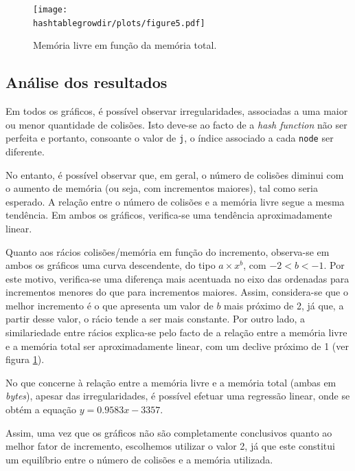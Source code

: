 \documentclass[portuguese,11pt,a4paper,titlepage]{article}
\newcommand{\srcdir}{..}
\newcommand{\hashtablegrowdir}{\srcdir/hash\_table\_grow-test}
\begin{document}
\begin{figure}[ht]
	\centering
	\texttt{[image: \\hashtablegrowdir/plots/figure5.pdf]}
	\caption{Memória livre em função da memória total.}
	\label{fig:htg_free_total}
\end{figure}

\subsection{Análise dos resultados}
Em todos os gráficos, é possível observar irregularidades, associadas a uma maior ou menor quantidade de colisões. Isto deve-se ao facto de a \textit{hash function} não ser perfeita e portanto, consoante o valor de \verb|j|, o índice associado a cada \verb|node| ser diferente.

No entanto, é possível observar que, em geral, o número de colisões diminui com o aumento de memória (ou seja, com incrementos maiores), tal como seria esperado. A relação entre o número de colisões e a memória livre segue a mesma tendência. Em ambos os gráficos, verifica-se uma tendência aproximadamente linear.

Quanto aos rácios colisões/memória em função do incremento, observa-se em ambos os gráficos uma curva descendente, do tipo \begin{math}a \times x^b\end{math}, com \begin{math}-2 < b < -1\end{math}. Por este motivo, verifica-se uma diferença mais acentuada no eixo das ordenadas para incrementos menores do que para incrementos maiores. Assim, considera-se que o melhor incremento é o que apresenta um valor de \begin{math}b\end{math} mais próximo de 2, já que, a partir desse valor, o rácio tende a ser mais constante. Por outro lado, a similariedade entre rácios explica-se pelo facto de a relação entre a memória livre e a memória total ser aproximadamente linear, com um declive próximo de 1 (ver figura \ref{fig:htg_free_total}).

No que concerne à relação entre a memória livre e a memória total (ambas em \textit{bytes}), apesar das irregularidades, é possível efetuar uma regressão linear, onde se obtém a equação \begin{math}y=0.9583x-3357\end{math}.

Assim, uma vez que os gráficos não são completamente conclusivos quanto ao melhor fator de incremento, escolhemos utilizar o valor 2, já que este constitui um equilíbrio entre o número de colisões e a memória utilizada.
\end{document}
